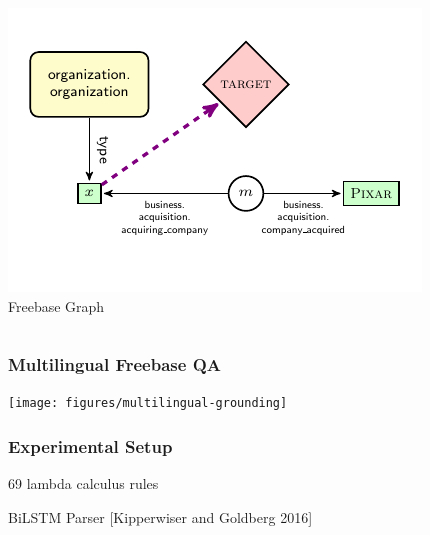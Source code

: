 \documentclass[mathserif,12pt]{beamer}
\newcommand \ignore[1]{}
\newcommand{\hlight}[1]{{\color{blue!80} #1}}
\begin{document}
\begin{frame}
\begin{columns}
\begin{column}{0.42\textwidth}
   \vspace{-1.5em} \includegraphics[width=\textwidth]{figures/transitive_grounded} \\ \vspace{-1.5em}Freebase Graph
  \end{column}
\end{columns}
\end{frame}

\begin{frame}
\frametitle{Multilingual Freebase QA}

\texttt{[image: figures/multilingual-grounding]}

\end{frame}

%
%
%
%
%

\begin{frame}
\frametitle{Experimental Setup}
\large
69 lambda calculus rules

\vspace{2em}
BiLSTM Parser {\small [Kipperwiser and Goldberg 2016]}\\

\ignore{
\begin{itemize}
\item English: 81.8 \\
\item German: 74.7 \\
\item Spanish: 82.2 \\
\end{itemize}
}
\end{frame}
\end{document}
